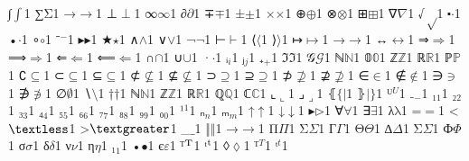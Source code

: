 {{{∫}{{\ensuremath{\int}}}1
{∑}{{\ensuremath{\mathrm{\Sigma}}}}1
{→}{{\ensuremath{\rightarrow}}}1
{⊥}{{\ensuremath{\perp}}}1
{∞}{{\ensuremath{\infty}}}1
{∂}{{\ensuremath{\partial}}}1
{∓}{{\ensuremath{\mp}}}1
{±}{{\ensuremath{\pm}}}1
{×}{{\ensuremath{\times}}}1
{⊕}{{\ensuremath{\oplus}}}1
{⊗}{{\ensuremath{\otimes}}}1
{⊞}{{\ensuremath{\boxplus}}}1
{∇}{{\ensuremath{\nabla}}}1
{√}{{\ensuremath{\sqrt}}}1
{⬝}{{\ensuremath{\cdot}}}1
{•}{{\ensuremath{\cdot}}}1
{∘}{{\ensuremath{\circ}}}1
{⁻}{{\ensuremath{^{-}}}}1
{▸}{{\ensuremath{\blacktriangleright}}}1
{★}{{\ensuremath{\star}}}1
{∧}{{\ensuremath{\wedge}}}1
{∨}{{\ensuremath{\vee}}}1
{¬}{{\ensuremath{\neg}}}1
{⊢}{{\ensuremath{\vdash}}}1
{⟨}{{\ensuremath{\langle}}}1
{⟩}{{\ensuremath{\rangle}}}1
{↦}{{\ensuremath{\mapsto}}}1
{→}{{\ensuremath{\rightarrow}}}1
{↔}{{\ensuremath{\leftrightarrow}}}1
{⇒}{{\ensuremath{\Rightarrow}}}1
{⟹}{{\ensuremath{\Longrightarrow}}}1
{⇐}{{\ensuremath{\Leftarrow}}}1
{⟸}{{\ensuremath{\Longleftarrow}}}1
{∩}{{\ensuremath{\cap}}}1
{∪}{{\ensuremath{\cup}}}1
{·}{{\ensuremath{\cdot}}}1
{ᵢ}{{\ensuremath{_i}}}1
{ⱼ}{{\ensuremath{_j}}}1
{₊}{{\ensuremath{_+}}}1
{ℑ}{{\ensuremath{\Im}}}1
{𝒢}{{\ensuremath{\mathcal{G}}}}1
{ℕ}{{\ensuremath{\mathbb{N}}}}1
{𝟘}{{\ensuremath{\mathbb{0}}}}1
{ℤ}{{\ensuremath{\mathbb{Z}}}}1
{ℝ}{{\ensuremath{\mathbb{R}}}}1
{ℙ}{{\ensuremath{\mathbb{P}}}}1
{∁}{{\ensuremath{\subseteq}}}1
{⊂}{{\ensuremath{\subseteq}}}1
{⊆}{{\ensuremath{\subseteq}}}1
{⊄}{{\ensuremath{\nsubseteq}}}1
{⊈}{{\ensuremath{\nsubseteq}}}1
{⊃}{{\ensuremath{\supseteq}}}1
{⊇}{{\ensuremath{\supseteq}}}1
{⊅}{{\ensuremath{\nsupseteq}}}1
{⊉}{{\ensuremath{\nsupseteq}}}1
{∈}{{\ensuremath{\in}}}1
{∉}{{\ensuremath{\notin}}}1
{∋}{{\ensuremath{\ni}}}1
{∌}{{\ensuremath{\notni}}}1
{∅}{{\ensuremath{\emptyset}}}1
{∖}{{\ensuremath{\setminus}}}1
{†}{{\ensuremath{\dag}}}1
{ℕ}{{\ensuremath{\mathbb{N}}}}1
{ℤ}{{\ensuremath{\mathbb{Z}}}}1
{ℝ}{{\ensuremath{\mathbb{R}}}}1
{ℚ}{{\ensuremath{\mathbb{Q}}}}1
{ℂ}{{\ensuremath{\mathbb{C}}}}1
{⌞}{{\ensuremath{\llcorner}}}1
{⌟}{{\ensuremath{\lrcorner}}}1
{⦃}{{\ensuremath{ \{\!| }}}1
{⦄}{{\ensuremath{ |\!\} }}}1
{ᵁ}{{\ensuremath{^U}}}1
{₋}{{\ensuremath{_{-}}}}1
{₁}{{\ensuremath{_1}}}1
{₂}{{\ensuremath{_2}}}1
{₃}{{\ensuremath{_3}}}1
{₄}{{\ensuremath{_4}}}1
{₅}{{\ensuremath{_5}}}1
{₆}{{\ensuremath{_6}}}1
{₇}{{\ensuremath{_7}}}1
{₈}{{\ensuremath{_8}}}1
{₉}{{\ensuremath{_9}}}1
{₀}{{\ensuremath{_0}}}1
{¹}{{\ensuremath{^1}}}1
{ₙ}{{\ensuremath{_n}}}1
{ₘ}{{\ensuremath{_m}}}1
{↑}{{\ensuremath{\uparrow}}}1
{↓}{{\ensuremath{\downarrow}}}1
{▸}{{\ensuremath{\triangleright}}}1
{∀}{{\ensuremath{\forall}}}1
{∃}{{\ensuremath{\exists}}}1
{λ}{{\ensuremath{\mathrm{\lambda}}}}1
{=}{{\ensuremath{=}}}1
{<}{{\ensuremath{\textless}}}1
{>}{{\ensuremath{\textgreater}}}1
{_}{{$\_$}}1
{‖}{{\ensuremath{\Vert}}}1
{→}{{$\rightarrow$}}1
{Π}{{$\Pi$}}1
{Σ}{{$\Sigma$}}1
{Г}{{$\Gamma$}}1
{Θ}{{$\Theta$}}1
{∆}{{$\Delta$}}1
{Σ}{{$\Sigma$}}1
{Ф}{{$\Phi$}}1
{σ}{{$\sigma$}}1
{δ}{{$\delta$}}1
{ν}{{$\nu$}}1
{η}{{$\eta$}}1
{₁}{{$_1$}}1
{•}{{$\bullet$}}1
{є}{{$\varepsilon$}}1
{ᵀ}{{$\textsuperscript{T}$}}1
{ᵗ}{{$\textsuperscript{t}$}}1
{◊}{{$\lozenge$}}1
{ᵀ}{{$^T$}}1
{ᵗ}{{$^t$}}1
 }
}

